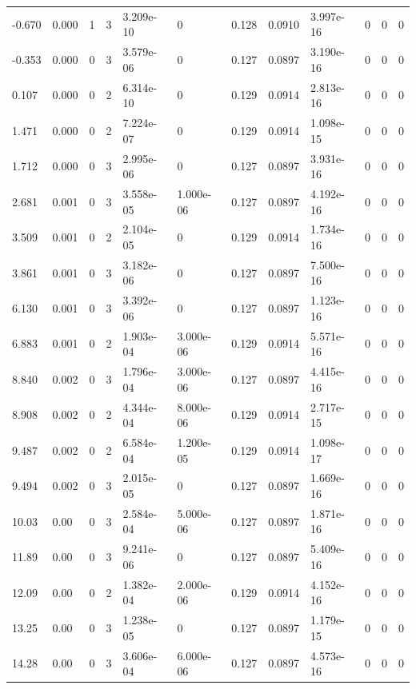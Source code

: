 \documentclass[preview]{standalone}
\begin{document}
{{\begin{tabular}{L{1.2cm}C{1.2cm} C{0.3cm}C{0.5cm} C{1.4cm}C{1.4cm} C{1.4cm}C{1.4cm} C{1.6cm}C{1.6cm} C{1.6cm}C{1.6cm}}
  -0.670  &  0.000  & 1     &  3 &  3.209e-10  & 0  &  0.128&   0.0910& 3.997e-16 & 0   &  0 & 0  \\ 
  -0.353  &  0.000  & 0     &  3 &  3.579e-06  & 0  &  0.127&   0.0897& 3.190e-16 & 0   &  0 & 0  \\ 
  0.107  &  0.000  & 0     &  2 &  6.314e-10  & 0  &  0.129&   0.0914& 2.813e-16 & 0   &  0 & 0  \\ 
  1.471  &  0.000  & 0     &  2 &  7.224e-07  & 0  &  0.129&   0.0914& 1.098e-15 & 0   &  0 & 0  \\ 
  1.712  &  0.000  & 0     &  3 &  2.995e-06  & 0  &  0.127&   0.0897& 3.931e-16 & 0   &  0 & 0  \\ 
  2.681  &  0.001  & 0     &  3 &  3.558e-05  & 1.000e-06  &  0.127&   0.0897& 4.192e-16 & 0   &  0 & 0  \\ 
  3.509  &  0.001  & 0     &  2 &  2.104e-05  & 0  &  0.129&   0.0914& 1.734e-16 & 0   &  0 & 0  \\ 
  3.861  &  0.001  & 0     &  3 &  3.182e-06  & 0  &  0.127&   0.0897& 7.500e-16 & 0   &  0 & 0  \\ 
  6.130  &  0.001  & 0     &  3 &  3.392e-06  & 0  &  0.127&   0.0897& 1.123e-16 & 0   &  0 & 0  \\ 
  6.883  &  0.001  & 0     &  2 &  1.903e-04  & 3.000e-06  &  0.129&   0.0914& 5.571e-16 & 0   &  0 & 0  \\ 
  8.840  &  0.002  & 0     &  3 &  1.796e-04  & 3.000e-06  &  0.127&   0.0897& 4.415e-16 & 0   &  0 & 0  \\ 
  8.908  &  0.002  & 0     &  2 &  4.344e-04  & 8.000e-06  &  0.129&   0.0914& 2.717e-15 & 0   &  0 & 0  \\ 
  9.487  &  0.002  & 0     &  2 &  6.584e-04  & 1.200e-05  &  0.129&   0.0914& 1.098e-17 & 0   &  0 & 0  \\ 
  9.494  &  0.002  & 0     &  3 &  2.015e-05  & 0  &  0.127&   0.0897& 1.669e-16 & 0   &  0 & 0  \\ 
  10.03  &  0.00  & 0     &  3 &  2.584e-04  & 5.000e-06  &  0.127&   0.0897& 1.871e-16 & 0   &  0 & 0  \\ 
  11.89  &  0.00  & 0     &  3 &  9.241e-06  & 0  &  0.127&   0.0897& 5.409e-16 & 0   &  0 & 0  \\ 
  12.09  &  0.00  & 0     &  2 &  1.382e-04  & 2.000e-06  &  0.129&   0.0914& 4.152e-16 & 0   &  0 & 0  \\ 
  13.25  &  0.00  & 0     &  3 &  1.238e-05  & 0  &  0.127&   0.0897& 1.179e-15 & 0   &  0 & 0  \\ 
  14.28  &  0.00  & 0     &  3 &  3.606e-04  & 6.000e-06  &  0.127&   0.0897& 4.573e-16 & 0   &  0 & 0  \\ 

\end{tabular}}}
\end{document}
